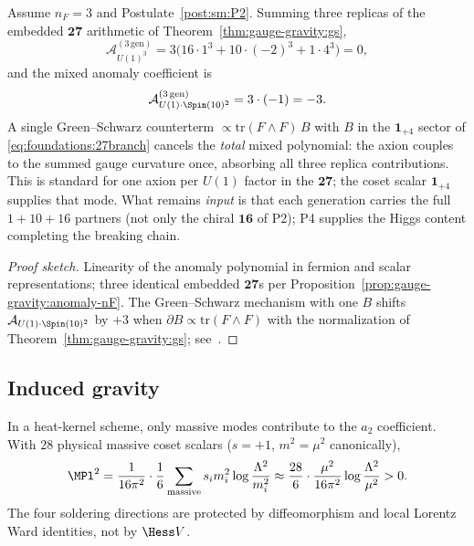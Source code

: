 \begin{proposition}[Mixed Green--Schwarz with $n_F=3$ replicas]
\label{prop:gauge-gravity:gs-nF}
Assume $n_F=3$ and Postulate~\ref{post:sm:P2}. Summing three replicas of the
embedded $\mathbf{27}$ arithmetic of Theorem~\ref{thm:gauge-gravity:gs},
\begin{equation}\label{eq:gauge-gravity:gs-nF-cubic}
  \mathcal{A}_{U(1)^3}^{(3\,\mathrm{gen})}
  = 3\bigl(16\cdot1^3+10\cdot(-2)^3+1\cdot4^3\bigr)=0,
\end{equation}
and the mixed anomaly coefficient is
\begin{equation}\label{eq:gauge-gravity:gs-nF-mixed}
  \mathcal{A}_{U(1)\cdot\Spin(10)^2}^{(3\,\mathrm{gen})}
  = 3\cdot(-1)=-3.
\end{equation}
A single Green--Schwarz counterterm $\propto\mathrm{tr}(F\wedge F)\,B$ with
$B$ in the $\mathbf{1}_{+4}$ sector of \eqref{eq:foundations:27branch} cancels
the \emph{total} mixed polynomial: the axion couples to the summed gauge
curvature once, absorbing all three replica contributions. This is standard
for one axion per $U(1)$ factor in the $\mathbf{27}$; the coset scalar
$\mathbf{1}_{+4}$ supplies that mode. What remains \emph{input} is that each
generation carries the full $1+10+16$ partners (not only the chiral
$\mathbf{16}$ of P2); P4 supplies the Higgs content completing the breaking
chain.
\end{proposition}

\begin{proof}[Proof sketch]
Linearity of the anomaly polynomial in fermion and scalar representations;
three identical embedded $\mathbf{27}$s per
Proposition~\ref{prop:gauge-gravity:anomaly-nF}. The Green--Schwarz mechanism
with one $B$ shifts $\mathcal{A}_{U(1)\cdot\Spin(10)^2}$ by $+3$ when
$\partial B\propto\mathrm{tr}(F\wedge F)$ with the normalization of
Theorem~\ref{thm:gauge-gravity:gs}; see~\cite{GreenSchwarz1984}.
\end{proof}

\subsection{Induced gravity}
\label{sec:gauge-gravity:gravity}

\begin{theorem}\label{thm:gauge-gravity:planck}
In a heat-kernel scheme, only massive modes contribute to the $a_2$ coefficient.
With $28$ physical massive coset scalars ($s=+1$, $m^2=\mu^2$ canonically),
\begin{equation}\label{eq:gauge-gravity:planck}
  \MPl^2
  =\frac{1}{16\pi^2}\cdot\frac{1}{6}\sum_{\mathrm{massive}} s_i m_i^2
  \log\frac{\Lambda^2}{m_i^2}
  \approx\frac{28}{6}\cdot\frac{\mu^2}{16\pi^2}
  \log\frac{\Lambda^2}{\mu^2}>0.
\end{equation}
The four soldering directions are protected by diffeomorphism and local Lorentz
Ward identities, not by $\Hess V$.
\end{theorem}

